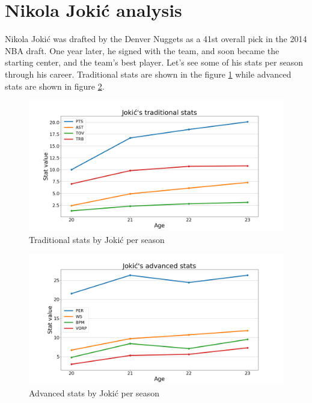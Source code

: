 \documentclass[a4paper]{article}
\begin{document}
\section{Nikola Joki\' c analysis}
\label{jokic}

Nikola Jokić was drafted by the Denver Nuggets as a 41st overall pick in the 2014 NBA draft. One year later, he signed with the team, and soon became the starting center, and the team's best player. Let's see some of his stats per season through his career. Traditional stats are shown in the figure \ref{plt:trad_jokic} while advanced stats are shown in figure \ref{plt:adv_jokic}.

\begin{figure}[h!]
\begin{center}
\includegraphics[scale=0.25]{jokic_plot_traditional.png}
\end{center}
\caption{Traditional stats by Joki\' c per season}
\label{plt:trad_jokic}
\end{figure}

\begin{figure}[h!]
\begin{center}
\includegraphics[scale=0.25]{jokic_plot_advanced.png}
\end{center}
\caption{Advanced stats by Joki\' c per season}
\label{plt:adv_jokic}
\end{figure}
\end{document}
